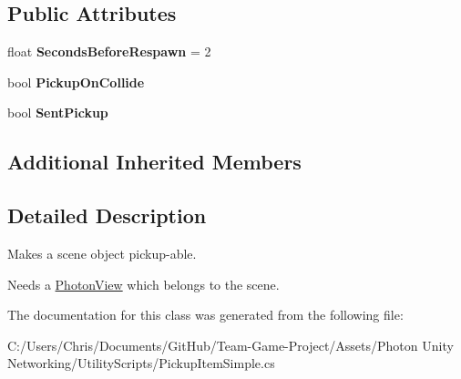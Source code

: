 \subsection*{Public Attributes}
\begin{DoxyCompactItemize}
\item 
float {\bfseries Seconds\+Before\+Respawn} = 2\hypertarget{class_pickup_item_simple_a0c8ca814aca61995c81df3cdc2bc7a3e}{}\label{class_pickup_item_simple_a0c8ca814aca61995c81df3cdc2bc7a3e}

\item 
bool {\bfseries Pickup\+On\+Collide}\hypertarget{class_pickup_item_simple_a733517ea66dbf144dc07a36b56aa8f83}{}\label{class_pickup_item_simple_a733517ea66dbf144dc07a36b56aa8f83}

\item 
bool {\bfseries Sent\+Pickup}\hypertarget{class_pickup_item_simple_a3b0327f9a9c6e4ed9f79e492e2959759}{}\label{class_pickup_item_simple_a3b0327f9a9c6e4ed9f79e492e2959759}

\end{DoxyCompactItemize}
\subsection*{Additional Inherited Members}


\subsection{Detailed Description}
Makes a scene object pickup-\/able. 

Needs a \hyperlink{class_photon_view}{Photon\+View} which belongs to the scene. 

The documentation for this class was generated from the following file\+:\begin{DoxyCompactItemize}
\item 
C\+:/\+Users/\+Chris/\+Documents/\+Git\+Hub/\+Team-\/\+Game-\/\+Project/\+Assets/\+Photon Unity Networking/\+Utility\+Scripts/Pickup\+Item\+Simple.\+cs\end{DoxyCompactItemize}
